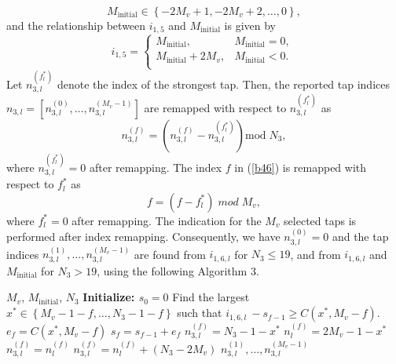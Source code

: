 \documentclass[lettersize,journal]{IEEEtran}
\renewcommand{\algorithmicrequire}{\textbf{Given:}}
\renewcommand{\algorithmicensure}{\textbf{Return:}}
\renewcommand{\algorithmicrequire}{\textbf{Input:}}
\renewcommand{\algorithmicensure}{\textbf{Output:}}
\begin{document}
\begin{equation}
  M_{\textrm{initial}}\in\left\{-2M_v+1,-2M_v+2,\ldots,0\right\},
\end{equation}
and the relationship between ${i_{1,5}}$ and $M_{\textrm{initial}}$ is given by
\begin{equation}
i_{1,5}=\left\{\begin{matrix}M_{\textrm{initial}},&M_{\textrm{initial}}=0,\ \\M_{\textrm{initial}}+2M_v,&M_{\textrm{initial}}<0.\\\end{matrix}\right.    
\end{equation}
Let $n_{3,l}^{(f_l^\ast)}$ denote the index of the strongest tap. Then, the reported tap indices $n_{3,l}=\left[n_{3,l}^{(0)},\ldots,n_{3,l}^{(M_v-1)}\right]$ are remapped with respect to $n_{3,l}^{(f_l^\ast)}$ as 
\begin{equation}
 n_{3,l}^{(f)}=\left(n_{3,l}^{(f)}-n_{3,l}^{(f_l^\ast)}\right) \mathrm{mod} \; N_3,
\end{equation}
where $n_{3,l}^{(f_l^\ast)}=0$ after remapping. The index $f$ in (\ref{b46}) is remapped with respect to $f_l^\ast$ as
\begin{equation}
    f=\left(f-f_l^\ast\right)\; mod\; M_v,
\end{equation}
where $f_l^\ast=0$ after remapping. The indication for the $M_v$ selected taps is performed after index remapping. Consequently, we have $n_{3,l}^{(0)}=0$ and the tap indices $n_{3,l}^{(1)},\ldots,n_{3,l}^{(M_v-1)}$ are found from \( i_{1,6,l} \) for \( N_3 \leq 19 \), and from \( i_{1,6,l} \) and \( M_{\textrm{initial}} \) for \( N_3 > 19 \), using the following Algorithm 3.

\renewcommand{\algorithmicrequire}{\textbf{Input:}}
\renewcommand{\algorithmicensure}{\textbf{Output:}}
\begin{algorithm}
\caption{Mapping of \( i_{1,6,l} \) and \( M_{\textrm{initial}} \) to indices of selected taps $n_{3,l}^{(1)},\ldots,n_{3,l}^{(M_v-1)}$}
\label{ciawf}       %
\begin{algorithmic}[1]
\Require  $M_v$, $ M_{\textrm{initial}}$, $N_3$
\State \textbf{Initialize:  $s_{0}=0$ }
\State Find the largest $x^\ast\in\left\{M_v-1-f,\ldots,N_3-1-f\right\}$ such that $i_{1,6,l}\ -s_{f-1}\geq C\left(x^\ast,M_v-f\right)$.
\State $e_f=C\left(x^\ast,M_v-f\right)$
\State $s_f=s_{f-1}+e_f$
\State $n_{3,l}^{(f)}=N_3-1-x^\ast$
\Else 
\State $n_l^{(f)}=2M_v-1-x^\ast$
\State $n_{3,l}^{(f)}=n_l^{(f)}$
\Else 
\State $n_{3,l}^{(f)}=n_l^{(f)}+(N_3-2M_v)$
\EndIf
\EndIf
\EndFor
\Ensure $n_{3,l}^{(1)},\ldots,n_{3,l}^{(M_v-1)}$
\end{algorithmic}
\end{algorithm}
\end{document}
